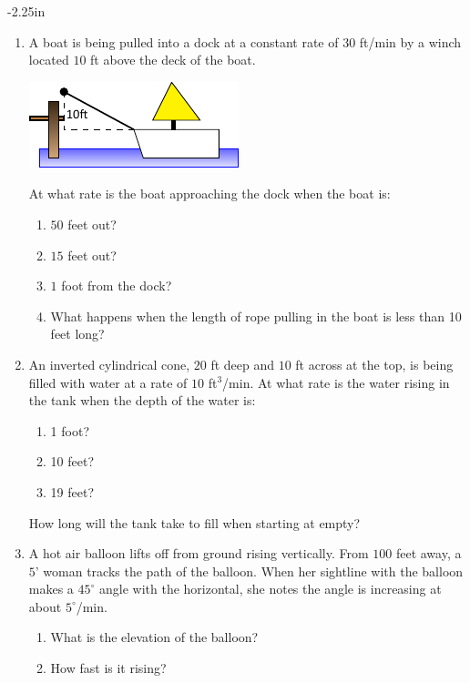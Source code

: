 \begin{adjustwidth*}{}{-2.25in}
\begin{multicols*}{2}
\begin{enumerate}[1),resume]
\item A boat is being pulled into a dock at a constant rate of $30$ ft/min by a winch located $10$ ft above the deck of the boat.

\includegraphics{figures/fig04_02_ex_10}

At what rate is the boat approaching the dock when the boat is:
\begin{enumerate}
\item	$50$ feet out?
\item	$15$ feet out?
\item	$1$ foot from the dock?
\item	What happens when the length of rope pulling in the boat is less than 10 feet long?
\end{enumerate}

\item An inverted cylindrical cone, $20$ ft deep and $10$ ft across at the top, is being filled with water at a rate of $10$ ft$^3$/min. At what rate is the water rising in the tank when the depth of the water is:
\begin{enumerate}
\item	1 foot?
\item	10 feet?
\item	19 feet?
\end{enumerate}
How long will the tank take to fill when starting at empty?

\item A hot air balloon lifts off from ground rising vertically. From $100$ feet away, a $5$' woman tracks the path of the balloon. When her sightline with the balloon makes a $45^\circ$ angle with the horizontal, she notes the angle is increasing at about $5^\circ$/min. 
\begin{enumerate}
\item		What is the elevation of the balloon?
\item		How fast is it rising?
\end{enumerate}



\end{enumerate}

\end{multicols*}
\end{adjustwidth*}

